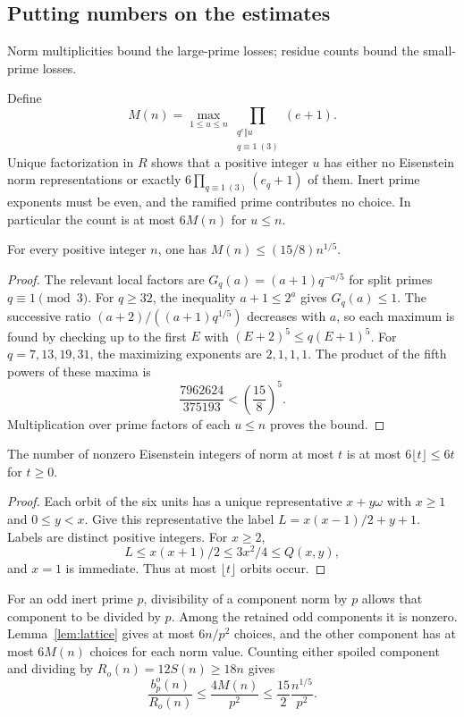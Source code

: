 \subsection{Putting numbers on the estimates}\label{sec:elementary}
Norm multiplicities bound the large-prime losses; residue counts bound
the small-prime losses.

Define
\[
M(n)=\max_{1\le u\le n}\prod_{\substack{q^e\Vert u\\q\equiv1\ (3)}}(e+1).
\]
Unique factorization in $R$ shows that a positive integer $u$ has either
no Eisenstein norm representations or exactly
$6\prod_{q\equiv1\ (3)}(e_q+1)$ of them. Inert prime exponents must
be even, and the ramified prime contributes no choice. In particular
the count is at most $6M(n)$ for $u\le n$.

\begin{lemma}\label{lem:divisor}
For every positive integer $n$, one has $M(n)\le(15/8)n^{1/5}$.
\end{lemma}
\begin{proof}
The relevant local factors are $G_q(a)=(a+1)q^{-a/5}$ for split primes
$q\equiv1\pmod3$. For $q\ge32$, the inequality $a+1\le2^a$ gives
$G_q(a)\le1$. The successive ratio
$(a+2)/((a+1)q^{1/5})$ decreases with $a$, so each maximum is found by
checking up to the first $E$ with $(E+2)^5\le q(E+1)^5$.
For $q=7,13,19,31$, the maximizing exponents are $2,1,1,1$.
The product of the fifth powers of these maxima is
\[
\frac{7962624}{375193}<\left(\frac{15}{8}\right)^5.
\]
Multiplication over prime factors of each $u\le n$ proves the bound.
\end{proof}

\begin{lemma}\label{lem:lattice}
The number of nonzero Eisenstein integers of norm at most $t$ is at most
$6\lfloor t\rfloor\le6t$ for $t\ge0$.
\end{lemma}
\begin{proof}
Each orbit of the six units has a unique representative $x+y\omega$ with
$x\ge1$ and $0\le y<x$. Give this representative the label
$L=x(x-1)/2+y+1$. Labels are distinct positive integers. For $x\ge2$,
\[
L\le x(x+1)/2\le3x^2/4\le Q(x,y),
\]
and $x=1$ is immediate. Thus at most $\lfloor t\rfloor$ orbits occur.
\end{proof}
For an odd inert prime $p$, divisibility of a component norm by $p$
allows that component to be divided by $p$. Among the retained odd
components it is nonzero. Lemma~\ref{lem:lattice} gives at most $6n/p^2$
choices, and the other component has at most $6M(n)$ choices for each
norm value. Counting either spoiled component and dividing by
$R_o(n)=12S(n)\ge18n$ gives
\begin{equation}\label{eq:tail-reps}
\frac{b_p^o(n)}{R_o(n)}\le\frac{4M(n)}{p^2}
\le\frac{15}{2}\frac{n^{1/5}}{p^2}.
\end{equation}

